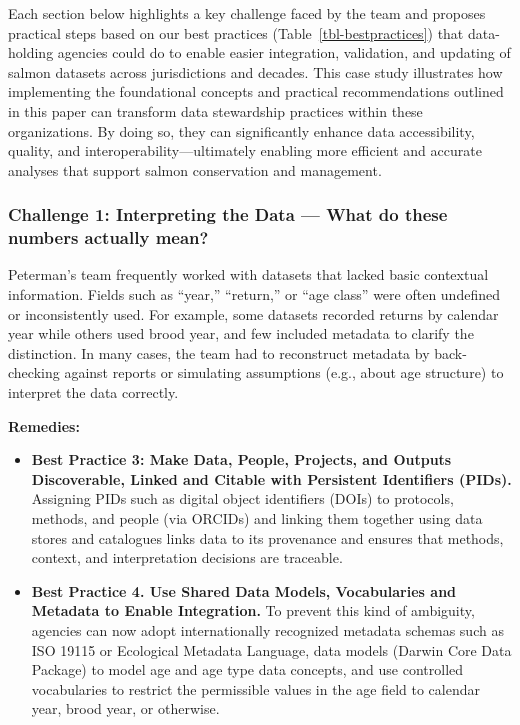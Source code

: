 \documentclass[
  letterpaper,
  DIV=11,
  numbers=noendperiod]{scrartcl}
\begin{document}
Each section below highlights a key challenge faced by the team and
proposes practical steps based on our best practices
(Table~\ref{tbl-bestpractices}) that data-holding agencies could do to
enable easier integration, validation, and updating of salmon datasets
across jurisdictions and decades. This case study illustrates how
implementing the foundational concepts and practical recommendations
outlined in this paper can transform data stewardship practices within
these organizations. By doing so, they can significantly enhance data
accessibility, quality, and interoperability---ultimately enabling more
efficient and accurate analyses that support salmon conservation and
management.

\subsubsection{Challenge 1: Interpreting the Data --- What do these
numbers actually
mean?}\label{challenge-1-interpreting-the-data-what-do-these-numbers-actually-mean}

Peterman's team frequently worked with datasets that lacked basic
contextual information. Fields such as ``year,'' ``return,'' or ``age
class'' were often undefined or inconsistently used. For example, some
datasets recorded returns by calendar year while others used brood year,
and few included metadata to clarify the distinction. In many cases, the
team had to reconstruct metadata by back-checking against reports or
simulating assumptions (e.g., about age structure) to interpret the data
correctly.

\textbf{Remedies:}

\begin{itemize}
\item
  \textbf{Best Practice 3: Make Data, People, Projects, and Outputs
  Discoverable, Linked and Citable with Persistent Identifiers (PIDs).}
  Assigning PIDs such as digital object identifiers (DOIs) to protocols,
  methods, and people (via ORCIDs) and linking them together using data
  stores and catalogues links data to its provenance and ensures that
  methods, context, and interpretation decisions are traceable.
\item
  \textbf{Best Practice 4. Use Shared Data Models, Vocabularies and
  Metadata to Enable Integration.} To prevent this kind of ambiguity,
  agencies can now adopt internationally recognized metadata schemas
  such as ISO 19115 or Ecological Metadata Language, data models (Darwin
  Core Data Package) to model age and age type data concepts, and use
  controlled vocabularies to restrict the permissible values in the age
  field to calendar year, brood year, or otherwise.
\end{itemize}
\end{document}
